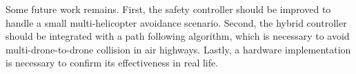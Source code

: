 \documentclass[journal,11pt,onecolumn,draftclsnofoot,]{IEEEtran}
\begin{document}
Some future work remains. First, the safety controller should be improved to handle a small multi-helicopter avoidance scenario. Second, the hybrid controller should be integrated with a path following algorithm, which is necessary to avoid multi-drone-to-drone collision in air highways. Lastly, a hardware implementation is necessary to confirm its effectiveness in real life.

%
%
%
%
%
%
%
\end{document}
